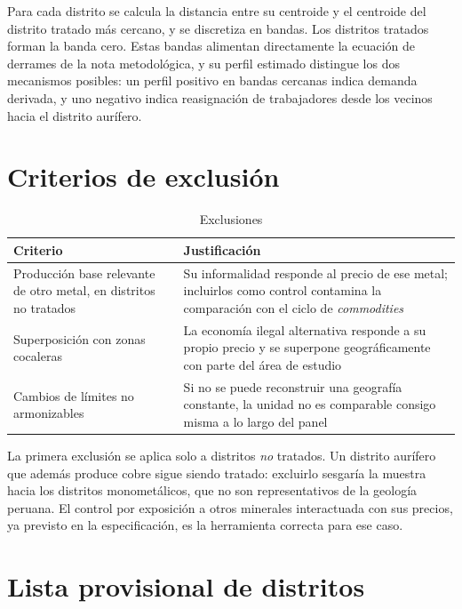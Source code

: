 \documentclass[11pt,a4paper]{article}
\begin{document}
Para cada distrito se calcula la distancia entre su centroide y el centroide del distrito tratado más cercano, y se discretiza en bandas. Los distritos tratados forman la banda cero. Estas bandas alimentan directamente la ecuación de derrames de la nota metodológica, y su perfil estimado distingue los dos mecanismos posibles: un perfil positivo en bandas cercanas indica demanda derivada, y uno negativo indica reasignación de trabajadores desde los vecinos hacia el distrito aurífero.

\section{Criterios de exclusión}

\begin{table}[h!]
\centering
\singlespacing
\caption{Exclusiones}
\label{tab:exclusiones}
\small
\begin{tabularx}{\textwidth}{L{3.9cm} X}
\toprule
\textbf{Criterio} & \textbf{Justificación} \\
\midrule
Producción base relevante de otro metal, en distritos no tratados & Su informalidad responde al precio de ese metal; incluirlos como control contamina la comparación con el ciclo de \emph{commodities} \\
\addlinespace
Superposición con zonas cocaleras & La economía ilegal alternativa responde a su propio precio y se superpone geográficamente con parte del área de estudio \\
\addlinespace
Cambios de límites no armonizables & Si no se puede reconstruir una geografía constante, la unidad no es comparable consigo misma a lo largo del panel \\
\bottomrule
\end{tabularx}
\end{table}

La primera exclusión se aplica solo a distritos \emph{no} tratados. Un distrito aurífero que además produce cobre sigue siendo tratado: excluirlo sesgaría la muestra hacia los distritos monometálicos, que no son representativos de la geología peruana. El control por exposición a otros minerales interactuada con sus precios, ya previsto en la especificación, es la herramienta correcta para ese caso.

\section{Lista provisional de distritos}
\end{document}
